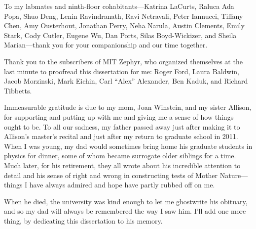 To my labmates and ninth-floor cohabitants---Katrina LaCurts, Raluca
Ada Popa, Shuo Deng, Lenin Ravindranath, Ravi Netravali, Peter
Iannucci, Tiffany Chen, Amy Ousterhout, Jonathan Perry, Neha Narula,
Austin Clements, Emily Stark, Cody Cutler, Eugene Wu, Dan Ports, Silas
Boyd-Wickizer, and Sheila Marian---thank you for your companionship
and our time together.

Thank you to the subscribers of MIT Zephyr, who
organized themselves at the last minute to proofread this
dissertation for me: Roger Ford, Laura Baldwin, Jacob Morzinski, Mark Eichin, Carl
``Alex'' Alexander, Ben Kaduk, and Richard Tibbetts.

Immeasurable gratitude is due to my mom, Joan Winstein, and my sister Allison,
for supporting and putting up with me and giving me a sense of how
things ought to be. To all our sadness, my father passed away just
after making it to Allison's master's recital and just after my return
to graduate school in 2011. When I was young, my dad would sometimes
bring home his graduate students in physics for dinner, some of whom
became surrogate older siblings for a time. Much later, for his
retirement, they all wrote about his incredible attention to detail
and his sense of right and wrong in constructing tests of Mother
Nature---things I have always admired and hope have partly
rubbed off on me.

When he died, the university was kind enough to let me ghostwrite his
obituary, and so my dad will always be remembered the way I saw
him. I'll add one more thing, by dedicating this dissertation to his
memory.
